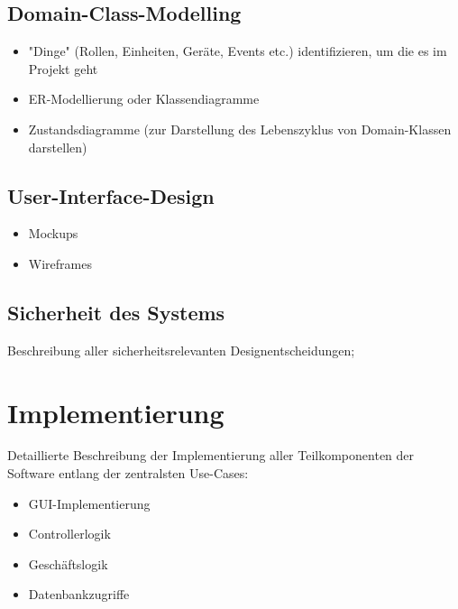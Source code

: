 



\newpage
\section{Domain-Class-Modelling}
\begin{itemize}
	\item "Dinge" (Rollen, Einheiten, Geräte, Events etc.) identifizieren, um die es im Projekt geht
	\item ER-Modellierung oder Klassendiagramme
	\item Zustandsdiagramme (zur Darstellung des Lebenszyklus von Domain-Klassen darstellen)
\end{itemize}

\newpage
\section{User-Interface-Design}
\begin{itemize}
	\item Mockups
	\item Wireframes
\end{itemize}










\section{Sicherheit des Systems}
Beschreibung aller sicherheitsrelevanten Designentscheidungen;

\chapter{Implementierung}
Detaillierte Beschreibung der Implementierung aller Teilkomponenten der Software entlang der zentralsten Use-Cases:

\begin{itemize}
	\item GUI-Implementierung
	\item Controllerlogik
	\item Geschäftslogik
	\item Datenbankzugriffe
\end{itemize}

